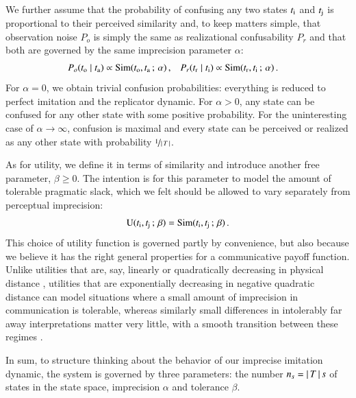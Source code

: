 \documentclass[fleqn,reqno,10pt]{article}
\newcommand{\imprecision}{\ensuremath{\alpha}} %
\newcommand{\toler}{\ensuremath{\beta}} %
\newcommand{\ns}{\ensuremath{n_s}} %
\newcommand{\similarity}{\ensuremath{\mathrm{Sim}}} %
\begin{document}
We further assume that the probability of confusing any two states $t_{\mathrm{i}}$ and
$t_{\mathrm{j}}$ is proportional to their perceived similarity and, to keep matters simple, that
observation noise $P_o$ is simply the same as realizational confusability $P_r$ and
that both are governed by the same imprecision parameter $\alpha$:
\begin{align*}
  P_o(\mystate{o} \probbar \mystate{a}) & \propto \similarity(\mystate{o}, \mystate{a} \myts ; \myts
  \imprecision)\,, &   P_r(\mystate{r} \probbar \mystate{i}) & \propto \similarity(\mystate{r}, \mystate{i} \myts ; \myts
  \imprecision) \,.
\end{align*}
For $\imprecision = 0$, we obtain trivial confusion probabilities: everything is reduced to
perfect imitation and the replicator dynamic. For $\imprecision > 0$, any state can be confused
for any other state with some positive probability. For the uninteresting case of
$\imprecision \rightarrow \infty$, confusion is maximal and every state can be perceived or
realized as any other state with probability $\nicefrac{1}{\left \lvert \, T \, \right\rvert}$.

As for utility, we define it in terms of similarity and introduce another free parameter, $\toler \ge 0$.
 The intention is for this parameter to model the amount of tolerable pragmatic slack, which we felt should be allowed to vary separately from perceptual imprecision:
\begin{align*}
  \util(\mystate{i}, \mystate{j} \myts ; \myts \toler) =
      \similarity(\mystate{i}, \mystate{j} \myts ; \myts \toler)\,.
\end{align*}
This choice of utility function is governed partly by convenience, but also because we believe it has the right general properties for a communicative payoff function.
Unlike utilities that are, say, linearly or
quadratically decreasing in physical distance
\citep[c.f.][]{JagerMetzger2011:Voronoi-Languag,FrankeJager2010:Vagueness-Signa}, utilities
that are exponentially decreasing in negative quadratic distance can model situations where a
small amount of imprecision in communication is tolerable, whereas similarly small differences
in intolerably far away interpretations matter very little, with a smooth transition between
these regimes \citep[c.f.][]{OConnor2013:The-Evolution-o}.

In sum, to structure thinking about the behavior of our imprecise imitation dynamic, the system
is governed by three parameters: the number $\ns = \card{T}s$ of states in the state space,
imprecision $\imprecision$ and tolerance $\toler$.
\end{document}
